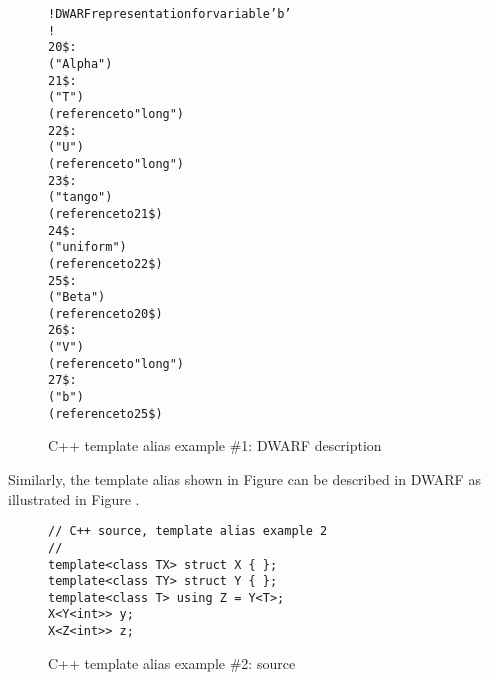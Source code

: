 \begin{figure}[h]
\begin{dwflisting}
\begin{alltt}
! DWARF representation for variable 'b'
!
20\$:  
          ("Alpha")
21\$:      
              ("T")
              (reference to "long")
22\$:      
              ("U")
              (reference to "long")
23\$:      
              ("tango")
              (reference to 21\$)
24\$:      
              ("uniform")
              (reference to 22\$)
25\$:  
          ("Beta")
          (reference to 20\$)
26\$:      
              ("V")
              (reference to "long")
27\$:  
          ("b")
          (reference to 25\$)
\end{alltt}
\end{dwflisting}
\caption{C++ template alias example \#1: DWARF description}
\label{fig:ctemplatealiasexample1dwarf}
\end{figure}

Similarly, the  template alias shown in
Figure 
can be described in DWARF as illustrated 
 in 
Figure .

\begin{figure}[h]
\begin{lstlisting}
// C++ source, template alias example 2
//
template<class TX> struct X { };
template<class TY> struct Y { };
template<class T> using Z = Y<T>;
X<Y<int>> y;
X<Z<int>> z;
\end{lstlisting}
\caption{C++ template alias example \#2: source}
\label{fig:ctemplatealiasexample2source}
\end{figure}

